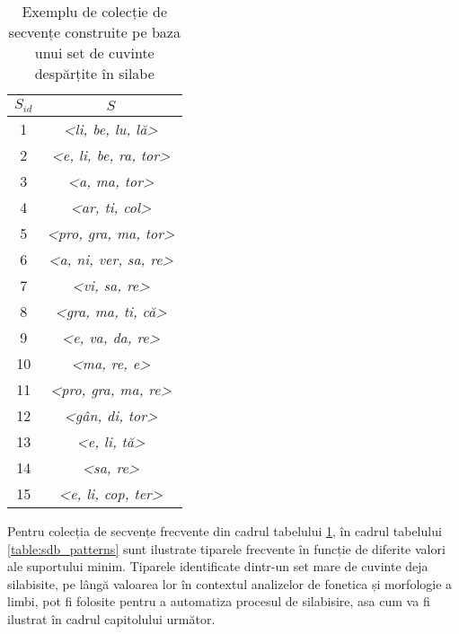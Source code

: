 \begin{table}[h]
\centering    
\begin{tabular}{|c|c|}    
\hline      
$S_{id}$ & $S$ \\
\hline
1 & \textit{<li, be, lu, lă>} \\
2 & \textit{<e, li, be, ra, tor>} \\
3 & \textit{<a, ma, tor>}\\
4 & \textit{<ar, ti, col>} \\
5 & \textit{<pro, gra, ma, tor>} \\
6 & \textit{<a, ni, ver, sa, re>} \\
7 & \textit{<vi, sa, re>} \\
8 & \textit{<gra, ma, ti, că>} \\
9 & \textit{<e, va, da, re>} \\
10 & \textit{<ma, re, e>} \\
11 & \textit{<pro, gra, ma, re>} \\
12 & \textit{<gân, di, tor>} \\
13 & \textit{<e, li, tă>} \\
14 & \textit{<sa, re>} \\
15 & \textit{<e, li, cop, ter>} \\
\hline                              
\end{tabular}
\caption{Exemplu de colecție de secvențe construite pe baza unui set de cuvinte despărțite în silabe}
\label{table:sdb_words}               
\end{table}

Pentru colecția de secvențe frecvente din cadrul tabelului \ref{table:sdb_words}, în cadrul tabelului \ref{table:sdb_patterns} sunt ilustrate tiparele frecvente în funcție de diferite valori ale suportului minim. Tiparele identificate dintr-un set mare de cuvinte deja silabisite, pe lângă valoarea lor în contextul analizelor de fonetica și morfologie a limbi, pot fi folosite pentru a automatiza procesul de silabisire, asa cum va fi ilustrat în cadrul capitolului următor.

